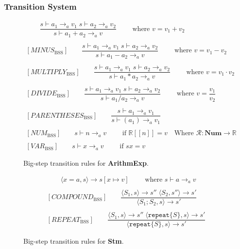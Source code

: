 \subsubsection*{Transition System}

\begin{figure}[htbp]
	\centering
	\begin{gather*}
		[PLUS_\text{BSS}] 
		\qquad \dfrac
		{s \vdash a_1 \rightarrow_a v_1 \; s \vdash a_2 \rightarrow_a v_2}
		{s \vdash a_1 + a_2 \rightarrow_a v}
		\qquad \text{ where }v = v_1 + v_2
		\\
		\\
		[MINUS_\text{BSS}] 
		\qquad \dfrac
		{s \vdash a_1 \rightarrow_a v_1 \; s \vdash a_2 \rightarrow_a v_2}
		{s \vdash a_1 - a_2 \rightarrow_a v}
		\qquad \text{ where }v = v_1 - v_2
		\\
		\\
		[MULTIPLY_\text{BSS}] 
		\qquad \dfrac
		{s \vdash a_1 \rightarrow_a v_1 \; s \vdash a_2 \rightarrow_a v_2}
		{s \vdash a_1 * a_2 \rightarrow_a v}
		\qquad \text{ where }v = v_1 \cdot v_2
		\\
		\\
		[DIVIDE_\text{BSS}] 
		\qquad \dfrac
		{s \vdash a_1 \rightarrow_a v_1 \; s \vdash a_2 \rightarrow_a v_2}
		{s \vdash a_1 / a_2 \rightarrow_a v}
		\qquad \text{ where }v = \dfrac{v_1}{v_2}
		\\
		\\
		[PARENTHESES_\text{BSS}] 
		\qquad \dfrac
		{s \vdash a_1 \rightarrow_a v_1}
		{s \vdash (a_1) \rightarrow_a v_1}
		\\
		\\
		[NUM_\text{BSS}] 
		\qquad s \vdash n \rightarrow_a v
		\qquad \text{ if } \mathbb{R}[\![n]\!] = v \quad \text{Where } \mathcal{R}:\textbf{Num}\rightarrow \mathbb{R}
		\\
		\\
		[VAR_\text{BSS}] 
		\qquad s \vdash x \rightarrow_a v
		\qquad \text{ if } sx = v
	\end{gather*}
	\caption{Big-step transition rules for \textbf{ArithmExp}.}
	\label{fig:BssArithm}
\end{figure}

\begin{figure}[htbp]
	\centering
	\begin{gather*}
		[ASSIGNMENT_\text{BSS}] 
		\qquad \langle x=a,s\rangle \rightarrow s[x\mapsto v]
		\qquad \text{ where }s\vdash a \rightarrow_a v
		\\
		\\
		[COMPOUND_\text{BSS}] 
		\qquad \dfrac
		{\langle S_1, s\rangle \rightarrow s'' \;\langle S_2, s''\rangle \rightarrow s'}
		{\langle S_1;S_2,s\rangle\rightarrow s'}
		\\
		\\
		[REPEAT_\text{BSS}] 
		\qquad \dfrac
		{\langle S_1, s\rangle \rightarrow s'' \;\langle \texttt{repeat} \{S\}, s\rangle \rightarrow s'}
		{\langle \texttt{repeat} \{S\}, s\rangle\rightarrow s'}
	\end{gather*}
	\caption{Big-step transition rules for \textbf{Stm}.}
	\label{fig:BssStm}
\end{figure}

